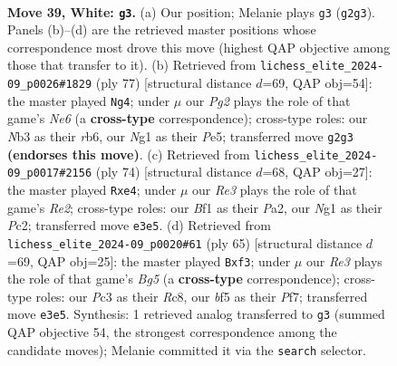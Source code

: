 \documentclass[11pt]{article}
\begin{document}
\clearpage

\begin{figure}[p]\centering
\begin{subfigure}{0.46\textwidth}\centering
\resizebox{\linewidth}{!}{%
\newchessgame
\chessboard[
  setfen={5r2/4r3/1p5k/p1p1nb2/P5p1/1NP1R3/K5PP/5BNR w - - 6 39},
  showmover=false,
  pgfstyle=straightmove, color=movearrow, markmove={g2-g3}
]}
\caption{}
\end{subfigure}\hfill
\begin{subfigure}{0.46\textwidth}\centering
\resizebox{\linewidth}{!}{%
\newchessgame
\chessboard[
  setfen={8/8/pR1N1rpk/2p1p2p/P3P3/3Pn1PK/3R4/2r5 b - - 1 39},
  showmover=false,
  pgfstyle=straightmove, color=movearrow, markmove={e3-g4}
]}
\caption{}
\end{subfigure}
\\[4pt]
\begin{subfigure}{0.46\textwidth}\centering
\resizebox{\linewidth}{!}{%
\newchessgame
\chessboard[
  setfen={4r3/p1k3p1/1pp2b2/7p/nPN1pP1P/6P1/P1P1RNK1/8 w - - 1 38},
  showmover=false,
  pgfstyle=straightmove, color=movearrow, markmove={e2-e4}
]}
\caption{}
\end{subfigure}\hfill
\begin{subfigure}{0.46\textwidth}\centering
\resizebox{\linewidth}{!}{%
\newchessgame
\chessboard[
  setfen={2r3k1/5pp1/2pP2n1/p6p/2p2PbP/P4BP1/8/3RN1K1 b - - 2 33},
  showmover=false,
  pgfstyle=straightmove, color=movearrow, markmove={g4-f3}
]}
\caption{}
\end{subfigure}
\caption{\textbf{Move 39, White: \texttt{g3}.} (a) Our position; Melanie plays \texttt{g3} (\texttt{g2g3}). Panels (b)--(d) are the retrieved master positions whose correspondence most drove this move (highest QAP objective among those that transfer to it). (b) Retrieved from \texttt{lichess\_elite\_2024-09\_p0026\#1829} (ply 77) [structural distance $d$=69, QAP obj=54]: the master played \texttt{Ng4}; under $\mu$ our \emph{Pg2} plays the role of that game's \emph{Ne6} (a \textbf{cross-type} correspondence); cross-type roles: our \emph{N}b3 as their \emph{r}b6, our \emph{N}g1 as their \emph{P}e5; transferred move \texttt{g2g3} \textbf{(endorses this move)}. (c) Retrieved from \texttt{lichess\_elite\_2024-09\_p0017\#2156} (ply 74) [structural distance $d$=68, QAP obj=27]: the master played \texttt{Rxe4}; under $\mu$ our \emph{Re3} plays the role of that game's \emph{Re2}; cross-type roles: our \emph{B}f1 as their \emph{P}a2, our \emph{N}g1 as their \emph{P}c2; transferred move \texttt{e3e5}. (d) Retrieved from \texttt{lichess\_elite\_2024-09\_p0020\#61} (ply 65) [structural distance $d$=69, QAP obj=25]: the master played \texttt{Bxf3}; under $\mu$ our \emph{Re3} plays the role of that game's \emph{Bg5} (a \textbf{cross-type} correspondence); cross-type roles: our \emph{P}c3 as their \emph{R}c8, our \emph{b}f5 as their \emph{P}f7; transferred move \texttt{e3e5}. Synthesis: 1 retrieved analog transferred to \texttt{g3} (summed QAP objective 54, the strongest correspondence among the candidate moves); Melanie committed it via the \texttt{search} selector.}
\label{fig:thought-m76}
\end{figure}
\end{document}

